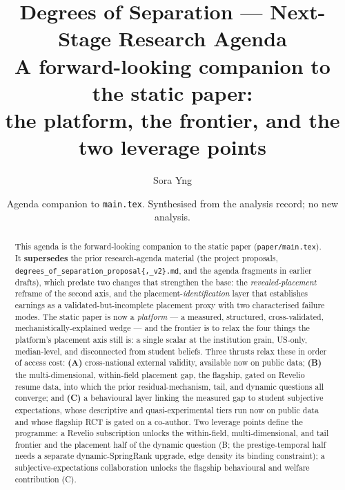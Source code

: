 \documentclass[11pt]{article}
\title{\textbf{Degrees of Separation --- Next-Stage Research Agenda}\\[4pt]
\large A forward-looking companion to the static paper:\\
the platform, the frontier, and the two leverage points}
\author{Sora Yng \and \coauthor{prospective advisors/collaborators --- see closing}}
\date{Agenda companion to \texttt{main.tex}. Synthesised from the analysis record; no new analysis.}
\begin{document}
\maketitle

\begin{abstract}
This agenda is the forward-looking companion to the static paper (\texttt{paper/main.tex}). It \textbf{supersedes}
the prior research-agenda material (the project proposals, \texttt{degrees\_of\_separation\_proposal\{,\_v2\}.md},
and the agenda fragments in earlier drafts), which predate two changes that strengthen the base: the
\emph{revealed-placement} reframe of the second axis, and the placement-\emph{identification} layer that
establishes earnings as a validated-but-incomplete placement proxy with two characterised failure modes. The
static paper is now a \emph{platform} --- a measured, structured, cross-validated, mechanistically-explained wedge
--- and the frontier is to relax the four things the platform's placement axis still is: a single scalar at the
institution grain, US-only, median-level, and disconnected from student beliefs. Three thrusts relax these in
order of access cost: \textbf{(A)} cross-national external validity, available now on public data; \textbf{(B)} the
multi-dimensional, within-field placement gap, the flagship, gated on Revelio resume data, into which the prior
residual-mechanism, tail, and dynamic questions all converge; and \textbf{(C)} a behavioural layer linking the
measured gap to student subjective expectations, whose descriptive and quasi-experimental tiers run now on public
data and whose flagship RCT is gated on a co-author. Two leverage points define the programme: a Revelio
subscription unlocks the within-field, multi-dimensional, and tail frontier and the placement half of the dynamic
question (B; the prestige-temporal half needs a separate dynamic-SpringRank upgrade, edge density its binding
constraint); a subjective-expectations collaboration unlocks the flagship behavioural and welfare contribution (C).
\end{abstract}

\end{document}
